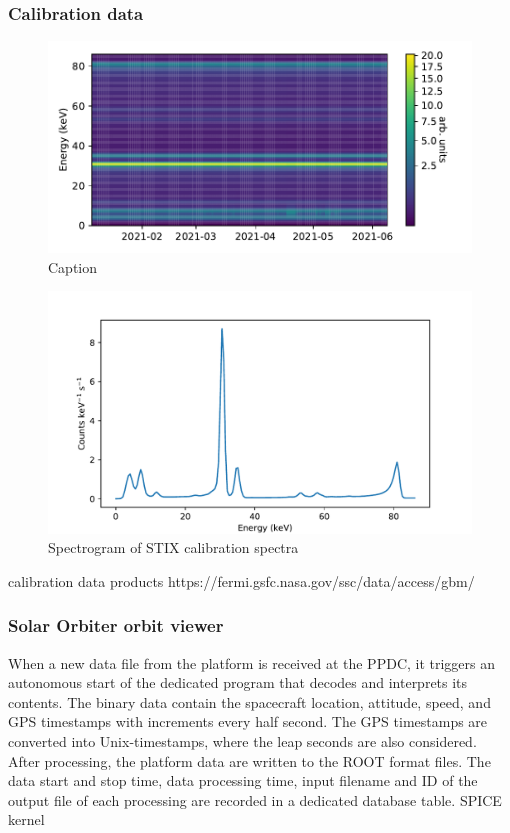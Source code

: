 \documentclass{aa}
\begin{document}
\subsubsection{Calibration data}
\begin{figure}
    \centering
    \includegraphics[width=0.8\linewidth]{figures/calibrationSpectrogram.pdf}
    \caption{Caption}
    \label{fig:calibrationSpectrum}
\end{figure}
\begin{figure}
    \centering
    \includegraphics[width=0.8\linewidth]{figures/calibrationSpectrum.pdf}
    \caption{Spectrogram of STIX calibration spectra}
    \label{fig:calibrationSpectrogram}
\end{figure}

calibration data products
https://fermi.gsfc.nasa.gov/ssc/data/access/gbm/
\subsubsection{Solar Orbiter orbit viewer}


When a new data file from the platform is received at the PPDC,
it triggers an autonomous start of the dedicated program that decodes and
interprets its contents. The binary data contain the spacecraft location, attitude, speed, and GPS timestamps with increments every half second. The GPS timestamps are converted into Unix-timestamps, where the leap seconds are also considered. After processing, the platform data are written to the ROOT format files. The data start and stop time, data processing time, input filename and ID of the output file of each processing are recorded in a dedicated database table.
SPICE kernel
\end{document}
